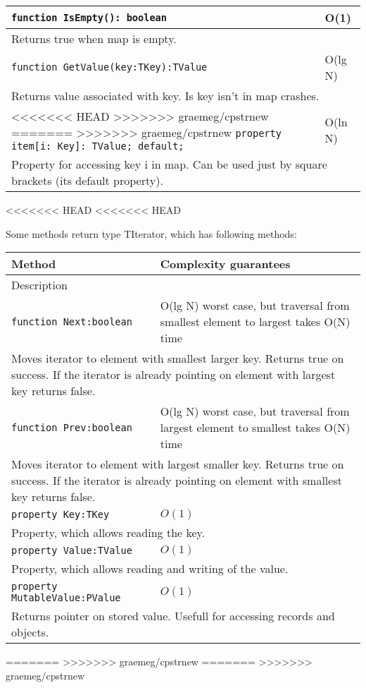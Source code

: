 \begin{longtable}{|m{10cm}|m{5cm}|}
\verb!function IsEmpty(): boolean! & O(1) \\ \hline
\multicolumn{2}{|m{15cm}|}{Returns true when map is empty.} \\\hline

\verb!function GetValue(key:TKey):TValue! & O(lg N) \\\hline
\multicolumn{2}{|m{15cm}|}{Returns value associated with key. Is key isn't in map crashes.} \\\hline

<<<<<<< HEAD
>>>>>>> graemeg/cpstrnew
=======
>>>>>>> graemeg/cpstrnew
\verb!property item[i: Key]: TValue; default;! & O(ln N) \\\hline
\multicolumn{2}{|m{15cm}|}{Property for accessing key i in map. Can be used just by square
brackets (its default property).} \\\hline\hline


\end{longtable}
<<<<<<< HEAD
<<<<<<< HEAD

Some methods return type TIterator, which has following methods:
\begin{longtable}{|m{10cm}|m{5cm}|}                                                             
\hline
Method & Complexity guarantees \\ \hline                                                  
\multicolumn{2}{|m{15cm}|}{Description} \\ \hline\hline                                               
\verb!function Next:boolean! & O(lg N) worst case, but traversal from smallest element to
largest takes O(N) time \\\hline
\multicolumn{2}{|m{15cm}|}{Moves iterator to element with smallest larger key. Returns true on
success. If the iterator is already pointing on element with largest key returns false.} \\\hline\hline

\verb!function Prev:boolean! & O(lg N) worst case, but traversal from largest element to
smallest takes O(N) time \\\hline
\multicolumn{2}{|m{15cm}|}{Moves iterator to element with largest smaller key. Returns true on
success. If the iterator is already pointing on element with smallest key returns false.} \\\hline\hline

\verb!property Key:TKey! & $O(1)$ \\\hline
\multicolumn{2}{|m{15cm}|}{Property, which allows reading the key.} \\\hline

\verb!property Value:TValue! & $O(1)$ \\\hline
\multicolumn{2}{|m{15cm}|}{Property, which allows reading and writing of the value.} \\\hline
\verb!property MutableValue:PValue! & $O(1)$ \\\hline
\multicolumn{2}{|m{15cm}|}{Returns pointer on stored value. Usefull for accessing records and
objects.} \\\hline


\end{longtable}
=======
>>>>>>> graemeg/cpstrnew
=======
>>>>>>> graemeg/cpstrnew
